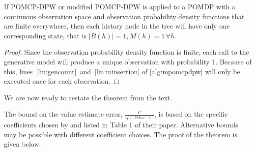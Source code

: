 \begin{lemma} \label{lem:onestate}
    If POMCP-DPW or modified POMCP-DPW is applied to a POMDP with a continuous observation space and observation probability density functions that are finite everywhere, then each history node in the tree will have only one corresponding state, that is $|B(h)| = 1, M(h)=1\, \forall h$.
\end{lemma}

\begin{proof}
    Since the observation probability density function is finite, each call to the generative model will produce a unique observation with probability 1.
    Because of this, lines~\ref{lin:gencount}~and~\ref{lin:minsertion} of \cref{alg:mpomcpdpw} will only be executed once for each observation.
\end{proof}

We are now ready to restate the theorem from the text.


\qmdp*

The bound on the value estimate error, $\frac{C}{n^{1/(10d_{\max}-7)}}$,
is based on the specific coefficients chosen by \citet{auger2013continuous} and listed in Table 1 of their paper. Alternative bounds may be possible with different coefficient choices. The proof of the theorem is given below.


